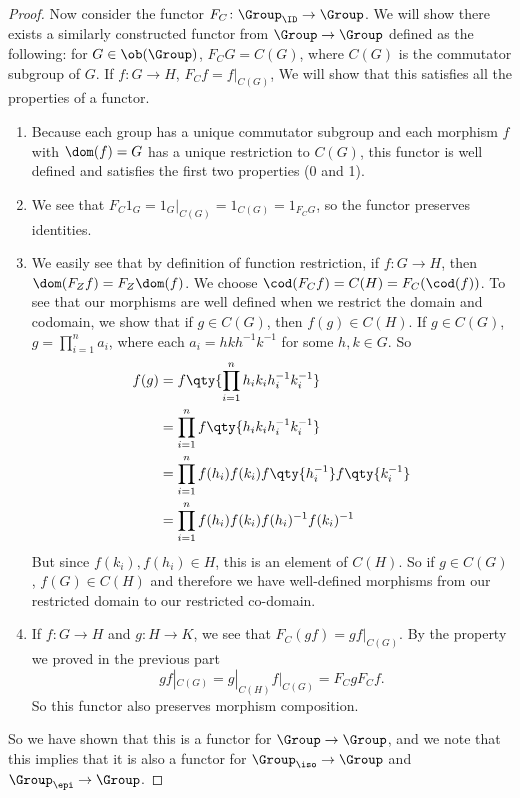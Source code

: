 \documentclass[../../main]{subfiles}
\begin{document}
\begin{proof}
Now consider the functor $F_C\colon  \Group_{\ID} \rightarrow \Group$. We will
show there exists a similarly constructed functor from $\Group \rightarrow
\Group$ defined as the following: for $G \in \ob(\Group)$, $F_CG = C(G)$, where
$ C(G) $ is the commutator subgroup of $G$. If $f \colon G \rightarrow H$, $F_Cf
= f|_{C(G)}$, We will show that this satisfies all the properties of a functor.
\begin{enumerate}
	\item Because each group has a unique commutator subgroup and each morphism
		$f$ with $\dom(f) = G$ has a unique restriction to $C(G)$, this functor
		is well defined and satisfies the first two properties (0 and 1).
	\item We see that $F_{C} 1_{G} = 1_{G}|_{C(G)} = 1_{C(G)} = 1_{F_{C}G}$, so
		the functor preserves identities.
	\item We easily see that by definition of function restriction, if $f\colon
		G \rightarrow H$, then $\dom(F_{Z}f) = F_{Z}\dom(f)$. We choose
		$\cod(F_{C}f) = C(H) = F_C(\cod(f))$. To see that our morphisms are well
		defined when we restrict the domain and codomain, we show that if $g \in
		C(G)$, then $f(g) \in C(H)$. If $g \in C(G)$, $g = \prod_{i = 1}^{n} a_i$,
		where each $a_i = hkh^{-1}k^{-1}$ for some $h,k \in G$. So
		\begin{align*}
			f(g) &= f\qty{\prod_{i = 1}^{n} h_ik_ih_i^{-1}k_i^{-1}} \\ &=
			\prod_{i = 1}^{n} f\qty{h_ik_ih_i^{-1}k_i^{-1}} \\ &=
			\prod_{i = 1}^{n} f(h_i)f(k_i)f\qty{h_i^{-1}}f\qty{k_i^{-1}} \\ &=
			\prod_{i = 1}^{n} f(h_i)f(k_i)f(h_i)^{-1}f(k_i)^{-1}
		\end{align*}
		But since $f(k_i), f(h_i) \in H$,
		this is an element of $C(H)$. So if $g \in C(G)$, $f(G) \in C(H)$ and
		therefore we have well-defined morphisms from our restricted domain to
		our restricted co-domain.
	\item If $f\colon G \rightarrow H$ and $g\colon H \rightarrow K$, we see
		that $F_C(gf) = gf|_{C(G)}$. By the property we proved in the previous
		part \[gf|_{C(G)} = g|_{C(H)}f|_{C(G)} = F_CgF_Cf.\] So this functor
		also preserves morphism composition.
\end{enumerate}

So we have shown that this is a functor for $\Group \rightarrow \Group$, and we
note that this implies that it is also a functor for $\Group_{\iso} \rightarrow
\Group$ and $\Group_{\epi} \rightarrow \Group$.


\end{proof}
\end{document}
